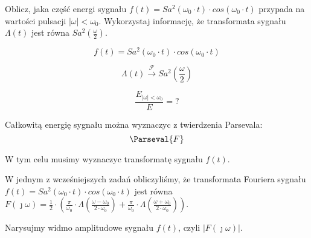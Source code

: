 \begin{task}

Oblicz, jaka część energi sygnału $f(t)=Sa^2\left(\omega_0 \cdot t\right) \cdot cos\left(\omega_0 \cdot t\right)$ przypada na wartości pulsacji 
$\left| \omega \right| < \omega_0$. Wykorzystaj informację, że transformata sygnału $\Lambda(t)$ jest równa $Sa^2\left(\frac{\omega}{2}\right)$.

\begin{equation}
f(t) = Sa^2\left(\omega_0 \cdot t\right) \cdot cos\left(\omega_0 \cdot t\right)
\end{equation}

\begin{equation}
\Lambda(t) \xrightarrow{\mathcal F} Sa^2\left(\frac{\omega}{2}\right)
\end{equation}

\begin{equation}
\frac{E_{\left| \omega \right| < \omega_0}}{E} = ?
\end{equation}

Całkowitą energię sygnału można wyznaczyc z twierdzenia Parsevala:
\begin{equation}
\Parseval{F}
\end{equation}

W tym celu musimy wyznaczyc transformatę sygnału $f(t)$.

W jednym z wcześniejszych zadań obliczyliśmy, że transformata Fouriera sygnału $f(t)=Sa^2\left(\omega_0 \cdot t\right) \cdot cos\left(\omega_0 \cdot t\right)$ jest równa $F(\jmath \omega)=\frac{1}{2 } \cdot \left( \frac{\pi}{ \omega_0 } \cdot \Lambda\left( \frac{\omega - \omega_0}{2\cdot \omega_0}\right) + \frac{\pi}{ \omega_0 } \cdot \Lambda\left( \frac{\omega + \omega_0}{2\cdot \omega_0}\right) \right)$.

Narysujmy widmo amplitudowe sygnału $f(t)$, czyli $\left|F(\jmath \omega)\right|$.

\begin{figure}[H]
	\centering
\end{figure}
\end{task}
